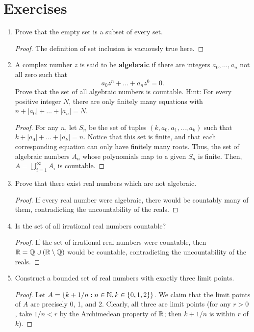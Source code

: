 \section{Exercises}
\begin{enumerate}
\item %
Prove that the empty set is a subset of every set.

\begin{proof}
The definition of set inclusion is vacuously true here.
\end{proof}

\item %
A complex number $z$ is said to be \textbf{algebraic} if there are integers $a_0, \dotsc, a_n$ not all zero such that
\[
	a_0z^n + \dotsc + a_nz^0 = 0.
\]
Prove that the set of all algebraic numbers is countable. Hint: For every positive integer $N$, there are only finitely many equations with $n + |a_0| + \dotsc + |a_n| = N$.

\begin{proof}
For any $n$, let $S_n$ be the set of tuples $(k, a_0, a_1, \dotsc, a_k)$ such that $k + |a_0| + \dotsc + |a_k| = n$. Notice that this set is finite, and that each corresponding equation can only have finitely many roots. Thus, the set of algebraic numbers $A_n$ whose polynomials map to a given $S_n$ is finite. Then, $A = \bigcup_{i=1}^{\infty} A_i$ is countable.
\end{proof}

\item %
Prove that there exist real numbers which are not algebraic.

\begin{proof}
If every real number were algebraic, there would be countably many of them, contradicting the uncountability of the reals.
\end{proof}

\item %
Is the set of all irrational real numbers countable?

\begin{proof}
If the set of irrational real numbers were countable, then $\mathbb{R} = \mathbb{Q} \cup (\mathbb{R} \setminus \mathbb{Q})$ would be countable, contradicting the uncountability of the reals.
\end{proof}

\item %
Construct a bounded set of real numbers with exactly three limit points.

\begin{proof}
Let $A = \{k + 1/n : n \in \mathbb{N}, k \in \{0, 1, 2\}\}$. We claim that the limit points of $A$ are precisely 0, 1, and 2. Clearly, all three are limit points (for any $r > 0$, take $1/n < r$ by the Archimedean property of $\mathbb{R}$; then $k + 1/n$ is within $r$ of $k$).


\end{proof}
\end{enumerate}

